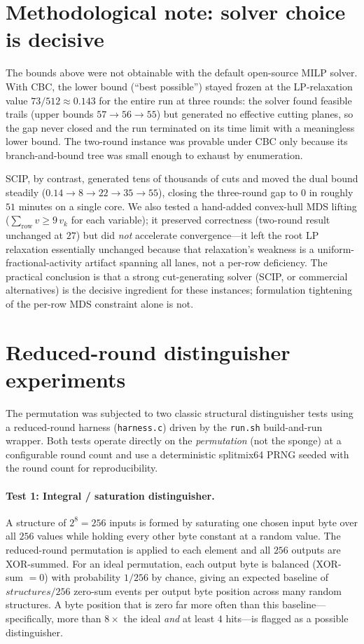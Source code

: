 \documentclass[11pt,a4paper]{article}
\begin{document}
\section{Methodological note: solver choice is decisive}
\label{sec:method-note}

The bounds above were not obtainable with the default open-source MILP solver.
With CBC, the lower bound (``best possible'') stayed frozen at the LP-relaxation
value $73/512 \approx 0.143$ for the entire run at three rounds: the solver found
feasible trails (upper bounds $57 \to 56 \to 55$) but generated no effective
cutting planes, so the gap never closed and the run terminated on its time limit
with a meaningless lower bound. The two-round instance was provable under CBC
only because its branch-and-bound tree was small enough to exhaust by
enumeration.

SCIP, by contrast, generated tens of thousands of cuts and moved the dual bound
steadily ($0.14 \to 8 \to 22 \to 35 \to 55$), closing the three-round gap to $0$
in roughly $51$ minutes on a single core. We also tested a hand-added
convex-hull MDS lifting ($\sum_{\text{row}} v \ge 9\,v_k$ for each variable);
it preserved correctness (two-round result unchanged at $27$) but did
\emph{not} accelerate convergence---it left the root LP relaxation essentially
unchanged because that relaxation's weakness is a uniform-fractional-activity
artifact spanning all lanes, not a per-row deficiency. The practical conclusion
is that a strong cut-generating solver (SCIP, or commercial alternatives) is the
decisive ingredient for these instances; formulation tightening of the per-row
MDS constraint alone is not.

\section{Reduced-round distinguisher experiments}
\label{sec:distinguishers}

The permutation was subjected to two classic structural distinguisher tests
using a reduced-round harness (\texttt{harness.c}) driven by the
\texttt{run.sh} build-and-run wrapper. Both tests operate directly on the
\emph{permutation} (not the sponge) at a configurable round count and use a
deterministic splitmix64 PRNG seeded with the round count for reproducibility.

\paragraph{Test 1: Integral / saturation distinguisher.}
A structure of $2^8 = 256$ inputs is formed by saturating one chosen input
byte over all $256$ values while holding every other byte constant at a random
value. The reduced-round permutation is applied to each element and all $256$
outputs are XOR-summed. For an ideal permutation, each output byte is balanced
(XOR-sum $= 0$) with probability $1/256$ by chance, giving an expected
baseline of $\mathit{structures}/256$ zero-sum events per output byte position
across many random structures. A byte position that is zero far more often
than this baseline---specifically, more than $8\times$ the ideal \emph{and}
at least $4$ hits---is flagged as a possible distinguisher.
\end{document}
